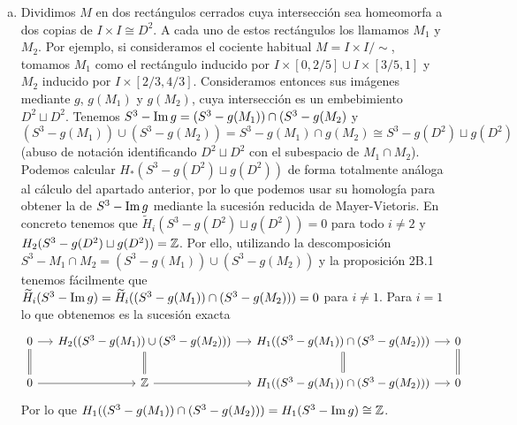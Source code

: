 \documentclass[twoside]{article}
\begin{document}
\begin{solucion}
\begin{enumerate}[(a)]


\item Dividimos $M$ en dos rectángulos cerrados cuya intersección sea homeomorfa a dos copias de $I\times I\cong D^2$. A cada uno de estos rectángulos los llamamos $M_1$ y $M_2$. Por ejemplo, si consideramos el cociente habitual $M=I\times I/\sim$, tomamos $M_1$ como el rectángulo inducido por $I\times [0,2/5]\cup I\times [3/5,1]$ y $M_2$ inducido por $I\times [2/3,4/3]$. Consideramos entonces sus imágenes mediante $g$, $g(M_1)$ y $g(M_2)$, cuya intersección es un embebimiento $D^2\sqcup D^2$. Tenemos $S^3-\operatorname{Im} g =(S^3-g(M_1))\cap (S^3-g(M_2)$ y $(S^3-g(M_1))\cup (S^3-g(M_2))=S^3-g(M_1)\cap g(M_2)\cong S^3-g(D^2)\sqcup g(D^2)$  (abuso de notación identificando $D^2\sqcup D^2$ con el subespacio de $M_1\cap M_2$). Podemos calcular $H_*(S^3-g(D^2)\sqcup g(D^2))$ de forma totalmente análoga al cálculo del apartado anterior, por lo que podemos usar su homología para obtener la de $S^3-\operatorname{Im} g$ mediante la sucesión reducida de Mayer-Vietoris. En concreto tenemos que $\widetilde{H}_i(S^3-g(D^2)\sqcup g(D^2))=0$ para todo $i\neq 2$ y $H_2(S^3-g(D^2)\sqcup g(D^2))=\mathbb{Z}$. Por ello, utilizando la descomposición $S^3-M_1\cap M_2 =(S^3-g(M_1))\cup (S^3-g(M_2))$ y la proposición 2B.1 tenemos fácilmente que $\widetilde{H}_i(S^3-\operatorname{Im} g)=\widetilde{H}_i((S^3-g(M_1))\cap (S^3-g(M_2)))=0$ para $i\neq 1$. Para $i=1$ lo que obtenemos es la sucesión exacta
\[
\begin{tikzcd}[column sep=13]
0\arrow[r]\arrow[d, equals] & H_2((S^3-g(M_1))\cup (S^3-g(M_2)))\arrow[r]\arrow[d, equals] & H_1((S^3-g(M_1))\cap (S^3-g(M_2)))\arrow[r]\arrow[d,equals] & 0\arrow[d, equals]\\
0 \arrow[r] & \Z\arrow[r] & H_1((S^3-g(M_1))\cap (S^3-g(M_2)))\arrow[r] & 0
\end{tikzcd}
\]
Por lo que $H_1((S^3-g(M_1))\cap (S^3-g(M_2)))=H_1(S^3-\operatorname{Im} g)\cong \mathbb{Z}$. 


\end{enumerate}
\end{solucion}
\end{document}
